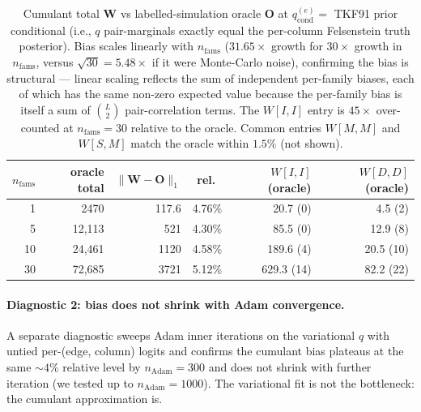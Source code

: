 \begin{table}[ht]
\centering\small
\begin{tabular}{rrrrrr}
\toprule
$n_{\text{fams}}$ & oracle total & $\|\mathbf{W} - \mathbf{O}\|_1$ & rel.\ &
$W[I, I]$ (oracle) & $W[D, D]$ (oracle) \\
\midrule
1 & 2470 & 117.6 & 4.76\% & 20.7 (0)  & 4.5 (2)   \\
5 & 12{,}113 & 521 & 4.30\% & 85.5 (0) & 12.9 (8) \\
10 & 24{,}461 & 1120 & 4.58\% & 189.6 (4) & 20.5 (10) \\
30 & 72{,}685 & 3721 & 5.12\% & 629.3 (14) & 82.2 (22) \\
\bottomrule
\end{tabular}
\caption{Cumulant total $\mathbf{W}$ vs labelled-simulation oracle
$\mathbf{O}$ at $q_{\text{cond}}^{(e)} =$ TKF91 prior conditional
(i.e., $q$ pair-marginals exactly equal the per-column Felsenstein
truth posterior).  Bias scales linearly with $n_{\text{fams}}$
($31.65\times$ growth for $30\times$ growth in $n_{\text{fams}}$,
versus $\sqrt{30} = 5.48\times$ if it were Monte-Carlo noise),
confirming the bias is structural --- linear scaling reflects the
sum of independent per-family biases, each of which has the same
non-zero expected value because the per-family bias is itself a
sum of $\binom{L}{2}$ pair-correlation terms.  The $W[I, I]$ entry
is $45\times$ over-counted at $n_{\text{fams}} = 30$ relative to
the oracle.  Common entries $W[M, M]$ and $W[S, M]$ match the
oracle within $1.5\%$ (not shown).}
\label{tab:cumulant-structural-bias}
\end{table}

\paragraph{Diagnostic 2: bias does not shrink with Adam convergence.}
A separate diagnostic sweeps Adam inner
iterations on the variational $q$ with untied per-(edge, column)
logits and confirms the cumulant bias plateaus at the same $\sim
4\%$ relative level by $n_{\text{Adam}} = 300$ and does not shrink
with further iteration (we tested up to $n_{\text{Adam}} = 1000$).
The variational fit is not the bottleneck: the cumulant
approximation is.

